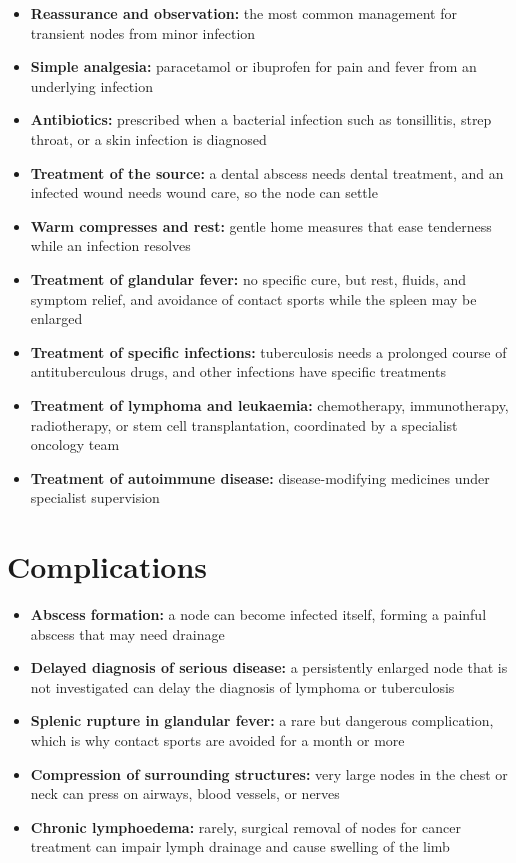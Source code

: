 \begin{itemize}
    \item \textbf{Reassurance and observation:} the most common management for transient nodes from minor infection
    \item \textbf{Simple analgesia:} paracetamol or ibuprofen for pain and fever from an underlying infection
    \item \textbf{Antibiotics:} prescribed when a bacterial infection such as tonsillitis, strep throat, or a skin infection is diagnosed
    \item \textbf{Treatment of the source:} a dental abscess needs dental treatment, and an infected wound needs wound care, so the node can settle
    \item \textbf{Warm compresses and rest:} gentle home measures that ease tenderness while an infection resolves
    \item \textbf{Treatment of glandular fever:} no specific cure, but rest, fluids, and symptom relief, and avoidance of contact sports while the spleen may be enlarged
    \item \textbf{Treatment of specific infections:} tuberculosis needs a prolonged course of antituberculous drugs, and other infections have specific treatments
    \item \textbf{Treatment of lymphoma and leukaemia:} chemotherapy, immunotherapy, radiotherapy, or stem cell transplantation, coordinated by a specialist oncology team
    \item \textbf{Treatment of autoimmune disease:} disease-modifying medicines under specialist supervision
\end{itemize}

\section*{Complications}
\begin{itemize}
    \item \textbf{Abscess formation:} a node can become infected itself, forming a painful abscess that may need drainage
    \item \textbf{Delayed diagnosis of serious disease:} a persistently enlarged node that is not investigated can delay the diagnosis of lymphoma or tuberculosis
    \item \textbf{Splenic rupture in glandular fever:} a rare but dangerous complication, which is why contact sports are avoided for a month or more
    \item \textbf{Compression of surrounding structures:} very large nodes in the chest or neck can press on airways, blood vessels, or nerves
    \item \textbf{Chronic lymphoedema:} rarely, surgical removal of nodes for cancer treatment can impair lymph drainage and cause swelling of the limb
\end{itemize}

